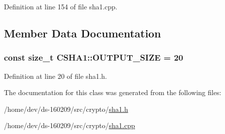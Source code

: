 Definition at line 154 of file sha1.\+cpp.



\subsection{Member Data Documentation}
\hypertarget{class_c_s_h_a1_a4dc144e60b3e32e7b2908096ecb413ef}{}
\subsubsection[{O\+U\+T\+P\+U\+T\+\_\+\+S\+I\+Z\+E}]{\setlength{\rightskip}{0pt plus 5cm}const size\+\_\+t C\+S\+H\+A1\+::\+O\+U\+T\+P\+U\+T\+\_\+\+S\+I\+Z\+E = 20\hspace{0.3cm}{\ttfamily [static]}}\label{class_c_s_h_a1_a4dc144e60b3e32e7b2908096ecb413ef}


Definition at line 20 of file sha1.\+h.



The documentation for this class was generated from the following files\+:\begin{DoxyCompactItemize}
\item 
/home/dev/ds-\/160209/src/crypto/\hyperlink{sha1_8h}{sha1.\+h}\item 
/home/dev/ds-\/160209/src/crypto/\hyperlink{sha1_8cpp}{sha1.\+cpp}\end{DoxyCompactItemize}
